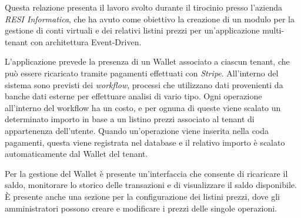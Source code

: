 Questa relazione presenta il lavoro svolto durante il tirocinio presso l'azienda \textit{RESI Informatica}, che ha avuto come obiettivo la creazione di un modulo per la
gestione di conti virtuali e dei relativi listini prezzi per un'applicazione multi-tenant con architettura Event-Driven.

L'applicazione prevede la presenza di un Wallet associato a ciascun tenant, che pu\`o essere ricaricato tramite pagamenti effettuati con \textit{Stripe}.
All'interno del sistema sono previsti dei \textit{workflow}, processi che utilizzano dati provenienti da banche dati esterne per effettuare analisi di vario tipo.
Ogni operazione all'interno del workflow ha un costo, e per ognuna di queste viene scalato un determinato importo in base a un listino prezzi associato al tenant di appartenenza dell'utente.
Quando un'operazione viene inserita nella coda pagamenti, questa viene registrata nel database e il relativo importo \`e scalato automaticamente dal Wallet del tenant.

Per la gestione del Wallet \`e presente un'interfaccia che consente di ricaricare il saldo, monitorare lo storico delle transazioni e di visualizzare il saldo disponibile.
\`E presente anche una sezione per la configurazione dei listini prezzi, dove gli amministratori possono creare e modificare i prezzi delle singole operazioni.
